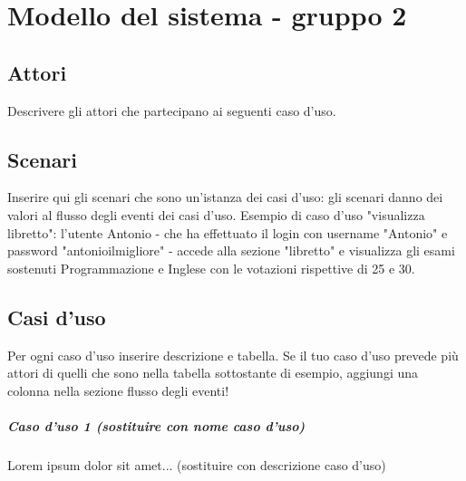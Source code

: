 
\chapter{Modello del sistema - gruppo 2}
\label{ref:modSistemaGruppo2}


\section{Attori}
Descrivere gli attori che partecipano ai seguenti caso d'uso.

\section{Scenari}
Inserire qui gli scenari che sono un'istanza dei casi d'uso: gli scenari danno dei valori al flusso degli eventi dei casi d'uso. Esempio di caso d'uso "visualizza libretto": l'utente Antonio - che ha effettuato il login con username "Antonio" e password "antonioilmigliore" - accede alla sezione "libretto" e visualizza gli esami sostenuti Programmazione e Inglese con le votazioni rispettive di 25 e 30.

\section{Casi d'uso}
Per ogni caso d'uso inserire descrizione e tabella. Se il tuo caso d'uso prevede più attori di quelli che sono nella tabella sottostante di esempio, aggiungi una colonna nella sezione flusso degli eventi!

\paragraph{Caso d'uso 1 (sostituire con nome caso d'uso) \\} 
Lorem ipsum dolor sit amet... (sostituire con descrizione caso d'uso)

